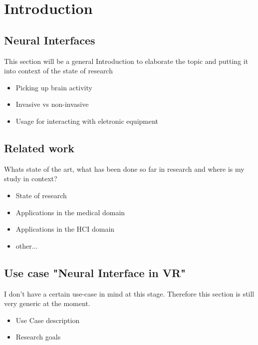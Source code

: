 
    \chapter{Introduction}

        \section{Neural Interfaces}

            This section will be a general Introduction to elaborate the topic and putting it into context of the state of research

            \begin{itemize}
                \item Picking up brain activity
                \item Invasive vs non-invasive
                \item Usage for interacting with eletronic equipment
            \end{itemize}

        \section{Related work}

            Whats state of the art, what has been done so far in research and where is my study in context?

            \begin{itemize}
                \item State of research
                \item Applications in the medical domain
                \item Applications in the HCI domain
                \item other...
            \end{itemize}

        \section{Use case "Neural Interface in VR"}

            I don't have a certain use-case in mind at this stage. Therefore this section is still very generic at the moment.

            \begin{itemize}
                \item Use Case description
                \item Research goals
            \end{itemize}        

